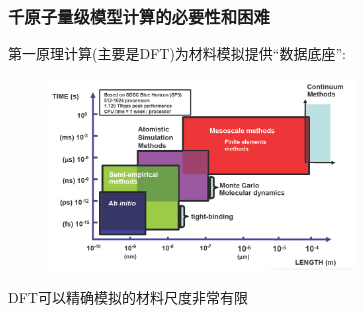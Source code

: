 \begin{frame}
	\frametitle{千原子量级模型计算的必要性和困难}
	第一原理计算(主要是\textrm{DFT})为材料模拟提供``数据底座'':
\begin{figure}[h!]
\includegraphics[height=2.00in,width=3.20in]{Figures/Multi-Scale-6.png}
\label{Multi-Scale-3}
\end{figure}
	\textrm{DFT}可以精确模拟的材料尺度非常有限
\end{frame}

